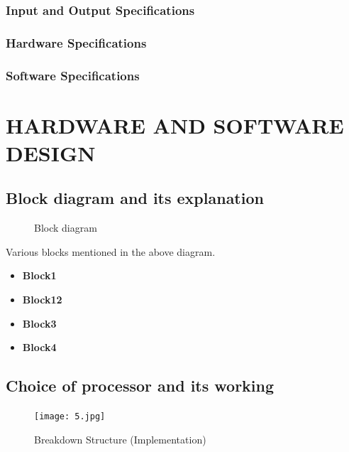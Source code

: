 \documentclass[12pt]{report}	%
\begin{document}
\subsection{Input and Output Specifications}

\subsection{Hardware Specifications}

\subsection{Software Specifications}

\chapter{HARDWARE AND SOFTWARE DESIGN}
\section{Block diagram and its explanation}


\begin{figure}[h!]
\begin{center}
	\caption{Block diagram }
\end{center}
\end{figure}
Various blocks  mentioned in the above diagram. 
\begin{itemize}
    \item {\bf  Block1}
       
    \item {\bf Block12}
     
    \item {\bf Block3 }
   
    \item {\bf Block4 }
   
\end{itemize}

\section{Choice of processor and its working  }

\begin{figure}[h!]
\begin{centering}
	\texttt{[image: 5.jpg]}
	\caption{  Breakdown Structure (Implementation) }
\end{centering}
\end {figure}
\end{document}
